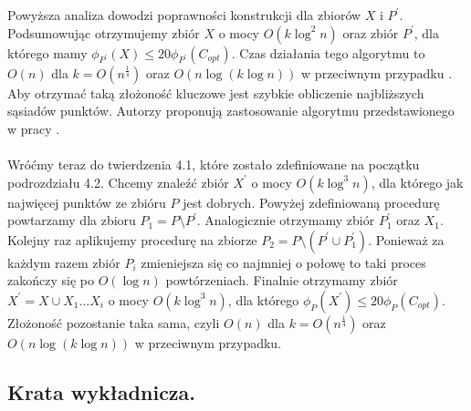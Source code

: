 \noindent
Powyższa analiza dowodzi poprawności konstrukcji dla zbiorów $X$ i $P^{'}$.
Podsumowując otrzymujemy zbiór $X$ o mocy $O(k \log^{2} n)$ oraz zbiór $P^{'}$, dla którego mamy $\phi_{P^{'}}(X) \leq 20\phi_{P^{'}}(C_{opt})$.
Czas działania tego algorytmu to $O(n)$ dla $k = O(n^{\frac{1}{4}})$ oraz $O(n \log (k \log n))$ w przeciwnym przypadku \cite{10.1145/1007352.1007400}.
Aby otrzymać taką złożoność kluczowe jest szybkie obliczenie najbliższych sąsiadów punktów.
Autorzy \cite{10.1145/1007352.1007400} proponują zastosowanie algorytmu przedstawionego w pracy \cite{10.1145/293347.293348}.
\\~\\
Wróćmy teraz do twierdzenia 4.1, które zostało zdefiniowane na początku podrozdziału 4.2.
Chcemy znaleźć zbiór $X^{'}$ o mocy $O(k \log^{3} n)$, dla którego jak najwięcej punktów ze zbióru $P$ jest dobrych.
Powyżej zdefiniowaną procedurę powtarzamy dla zbioru $P_{1} = P \setminus P^{'}$.
Analogicznie otrzymamy zbiór $P_{1}^{'}$ oraz $X_{1}$.
Kolejny raz aplikujemy procedurę na zbiorze $P_{2} = P \setminus (P^{'} \cup P_{1}^{'})$.
Ponieważ za każdym razem zbiór $P_{i}$ zmieniejsza się co najmniej o połowę to taki proces zakończy się po $O(\log n)$ powtórzeniach.
Finalnie otrzymamy zbiór $X^{'} = X \cup X_{1} \dots X_{i}$ o mocy $O(k \log^{3} n)$, dla którego $\phi_{P}(X^{'}) \leq 20\phi_{P}(C_{opt})$.
Złożoność pozostanie taka sama, czyli $O(n)$ dla $k = O(n^{\frac{1}{4}})$ oraz $O(n \log (k \log n))$ w przeciwnym przypadku.

\subsection{Krata wykładnicza.}

